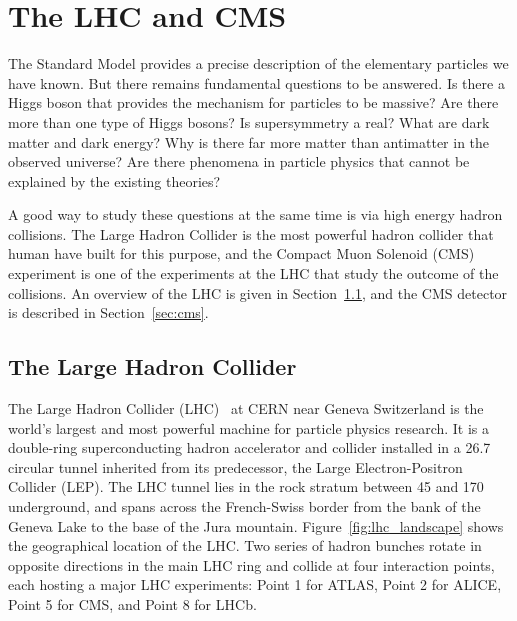 \chapter{The LHC and CMS}

The Standard Model provides a precise description of the elementary particles we have known.
But there remains fundamental questions to be answered.
Is there a Higgs boson that provides the mechanism for particles to be massive?
Are there more than one type of Higgs bosons?
Is supersymmetry a real?
What are dark matter and dark energy?
Why is there far more matter than antimatter in the observed universe?
Are there phenomena in particle physics that cannot be explained by the existing theories?

A good way to study these questions at the same time is via high energy hadron collisions.
The Large Hadron Collider is the most powerful hadron collider that human have built for this purpose,
and the Compact Muon Solenoid (CMS) experiment is one of the experiments at the LHC that study the outcome of the collisions. 
An overview of the LHC is given in Section~\ref{sec:lhc}, and the CMS detector is described in Section~\ref{sec:cms}.

\section{The Large Hadron Collider}\label{sec:lhc}

The Large Hadron Collider (LHC)~\cite{Evans_2008} at CERN near Geneva Switzerland is the world's largest and most powerful machine for particle physics research.
It is a double-ring superconducting hadron accelerator and collider installed in a 26.7 \km circular tunnel inherited from its predecessor, the Large Electron-Positron Collider (LEP).
The LHC tunnel lies in the rock stratum between 45 \meter and 170 \meter underground, 
and spans across the French-Swiss border from the bank of the Geneva Lake to the base of the Jura mountain.   
Figure~\ref{fig:lhc_landscape} shows the geographical location of the LHC. 
Two series of hadron bunches rotate in opposite directions in the main LHC ring and collide at four interaction points, 
each hosting a major LHC experiments: Point 1 for ATLAS, Point 2 for ALICE, Point 5 for CMS, and Point 8 for LHCb.

